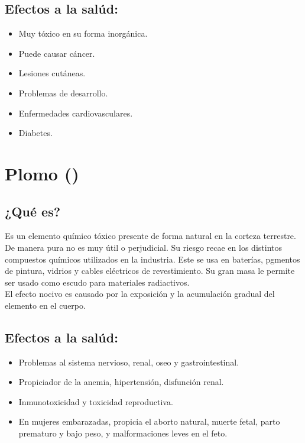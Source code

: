 \documentclass[letterpaper, 12pt]{article}
\begin{document}
\begin{justify}
    \subsection{Efectos a la salúd:}
    \begin{itemize}
        \item Muy tóxico en su forma inorgánica.
        \item Puede causar cáncer.
        \item Lesiones cutáneas.
        \item Problemas de desarrollo.
        \item Enfermedades cardiovasculares.
        \item Diabetes.
    \end{itemize}
    \section{Plomo ()}
    \subsection{¿Qué es?}
    Es un elemento químico tóxico presente de forma natural en la corteza terrestre. De manera pura no es muy útil o perjudicial. Su riesgo recae en los distintos compuestos químicos utilizados en la industria.
    Este se usa en baterías, pgmentos de pintura, vidrios y cables eléctricos de revestimiento. Su gran masa le permite ser usado como escudo para materiales radiactivos.\\ \newline
    El efecto nocivo es causado por la exposición y la acumulación gradual del elemento en el cuerpo.
    \subsection{Efectos a la salúd:}
    \begin{itemize}
        \item Problemas al sistema nervioso, renal, oseo y gastrointestinal.
        \item Propiciador de la anemia, hipertensión, disfunción renal.
        \item Inmunotoxicidad y toxicidad reproductiva.
        \item En mujeres embarazadas, propicia el aborto natural, muerte fetal, parto prematuro y bajo peso, y malformaciones leves en el feto.
    \end{itemize}
        \end{justify}

        \newpage
        \printbibliography
\end{document}
